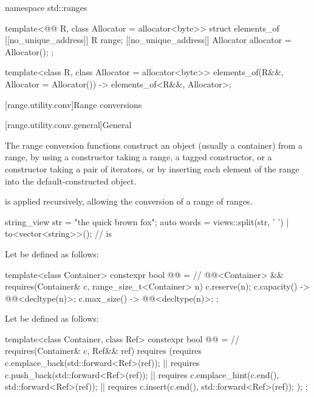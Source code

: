 \begin{codeblock}
namespace std::ranges {
  template<@@ R, class Allocator = allocator<byte>>
  struct elements_of {
    [[no_unique_address]] R range;
    [[no_unique_address]] Allocator allocator = Allocator();
  };

  template<class R, class Allocator = allocator<byte>>
    elements_of(R&&, Allocator = Allocator()) -> elements_of<R&&, Allocator>;
}
\end{codeblock}

[range.utility.conv]{Range conversions}

[range.utility.conv.general]{General}

\pnum
The range conversion functions construct
an object (usually a container) from a range,
by using a constructor taking a range,
a  tagged constructor, or
a constructor taking a pair of iterators, or
by inserting each element of the range into the default-constructed object.

\pnum
{} is applied recursively,
allowing the conversion of a range of ranges.

\begin{example}
\begin{codeblock}
string_view str = "the quick brown fox";
auto words = views::split(str, ' ') | to<vector<string>>();
//  is 
\end{codeblock}
\end{example}

\pnum
Let  be defined as follows:
\begin{codeblock}
template<class Container>
constexpr bool @@ =          // \expos
  @@<Container> &&
  requires(Container& c, range_size_t<Container> n) {
    c.reserve(n);
    { c.capacity() } -> @@<decltype(n)>;
    { c.max_size() } -> @@<decltype(n)>;
  };
\end{codeblock}

\pnum
Let  be defined as follows:
\begin{codeblock}
template<class Container, class Ref>
constexpr bool @@ =          // \expos
  requires(Container& c, Ref&& ref) {
    requires (requires { c.emplace_back(std::forward<Ref>(ref)); } ||
              requires { c.push_back(std::forward<Ref>(ref)); } ||
              requires { c.emplace_hint(c.end(), std::forward<Ref>(ref)); } ||
              requires { c.insert(c.end(), std::forward<Ref>(ref)); });
  };
\end{codeblock}

